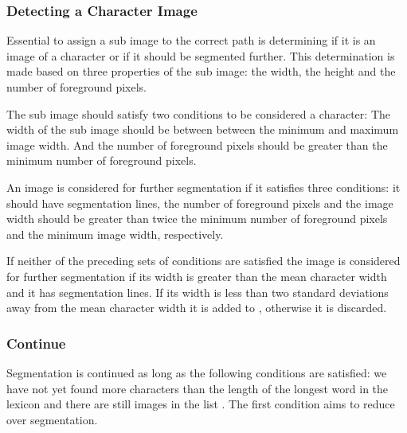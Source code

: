 \subsubsection{Detecting a Character Image}
\label{sss:method:segmentaton:segmentfurther}
	Essential to assign a sub image to the correct path is determining if it is an image of a character or if it should be segmented further. This determination is made based on three properties of the sub image: the width, the height and the number of foreground pixels. 

	The sub image should satisfy two conditions to be considered a character: The width of the sub image should be between between the minimum and maximum image width. And the number of foreground pixels should be greater than the minimum number of foreground pixels.

	An image is considered for further segmentation if it satisfies three conditions: it should have segmentation lines, the number of foreground pixels and the image width should be greater than twice the minimum number of foreground pixels and the minimum image width, respectively. 

	If neither of the preceding sets of conditions are satisfied the image is considered for further segmentation if its width is greater than the mean character width and it has segmentation lines. If its width is less than two standard deviations away from the mean character width it is added to \characters, otherwise it is discarded.

\subsubsection{Continue}
\label{sss:method:segmentaton:termination}
	Segmentation is continued as long as the following conditions are satisfied: we have not yet found more characters than the length of the longest word in the lexicon and there are still images in the list \segmentfurther. The first condition aims to reduce over segmentation.